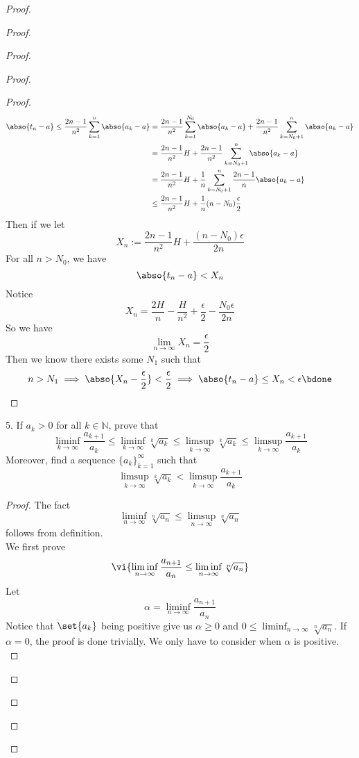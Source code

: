 \documentclass{report}
\begin{document}
\begin{proof}
\begin{proof}
\begin{proof}
\begin{proof}
\begin{proof}
\begin{align*}
  \abso{t_n-a}\leq \frac{2n-1}{n^2}\sum_{k=1}^n \abso{a_k-a}&=\frac{2n-1}{n^2}\sum_{k=1}^{N_0}\abso{a_k-a}+\frac{2n-1}{n^2}\sum_{k=N_0+1}^n \abso{a_k-a}\\
&=\frac{2n-1}{n^2}H+\frac{2n-1}{n^2}\sum_{k=N_0+1}^n \abso{a_k-a}\\
&= \frac{2n-1}{n^2}H+\frac{1}{n}\sum_{k=N_0+1}^n \frac{2n-1}{n}\abso{a_k-a}\\
&\leq  \frac{2n-1}{n^2}H+ \frac{1}{n}(n-N_0) \frac{\epsilon }{2} 
\end{align*}
Then if we let 
\begin{equation*}
X_n:=\frac{2n-1}{n^2}H+\frac{(n-N_0)\epsilon }{2n}
\end{equation*}
For all $n>N_0$, we have
 \begin{equation*}
\abso{t_n-a}<X_n
\end{equation*}
Notice 
\begin{equation*}
X_n=\frac{2H}{n}-\frac{H}{n^2}+\frac{\epsilon}{2}-\frac{N_0\epsilon }{2n}
\end{equation*}
So we have
\begin{equation*}
\lim_{n\to\infty}X_n=\frac{\epsilon}{2}
\end{equation*}
Then we know there exists some $N_1$ such that 
 \begin{equation*}
   n>N_1\implies \abso{X_n-\frac{\epsilon}{2}}<\frac{\epsilon}{2}\implies \abso{t_n-a}\leq X_n<\epsilon \bdone
\end{equation*}


\end{proof}
\begin{question}{}{}
5. If $a_k > 0$ for all $k \in \mathbb{N}$, prove that
\[
  \liminf_{k\to\infty} \frac{a_{k+1}}{a_k} \leq \liminf_{k\to\infty} \sqrt[k]{a_k} \leq \limsup_{k\to\infty} \sqrt[k]{a_k} \leq \limsup_{k\to\infty} \frac{a_{k+1}}{a_k}
\]
Moreover, find a sequence $\{a_k\}_{k=1}^{\infty}$ such that 
\[
  \limsup_{k\to\infty} \sqrt[k]{a_k} < \limsup_{k\to\infty} \frac{a_{k+1}}{a_k}
\]
\end{question}

\begin{proof}
The fact 
\begin{equation*}
\liminf_{n\to\infty} \sqrt[n]{a_n}\leq \limsup_{n\to\infty} \sqrt[n]{a_n}  
\end{equation*}
follows from definition.\\

We first prove
\begin{equation*}
  \vi{\liminf_{n\to\infty} \frac{a_{n+1}}{a_n}\leq \liminf_{n\to\infty} \sqrt[n]{a_n}}
\end{equation*}
Let 
\begin{equation*}
\alpha =\liminf_{n\to\infty} \frac{a_{n+1}}{a_n}
\end{equation*}
Notice that $\set{a_k}$ being positive give us $\alpha \geq 0$ and $0\leq \liminf_{n\to\infty} \sqrt[n]{a_n} $. If $\alpha =0$, the proof is done trivially. We only have to consider when $\alpha $ is positive.\\


\end{proof}
\end{proof}
\end{proof}
\end{proof}
\end{proof}
\end{document}
